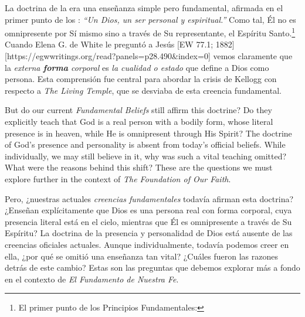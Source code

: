 La doctrina de la  era una enseñanza simple pero fundamental, afirmada en el primer punto de los : \textit{“Un Dios, un ser personal y espiritual.”} Como tal, Él no es omnipresente por Sí mismo sino a través de Su representante, el Espíritu Santo.\footnote{El primer punto de los Principios Fundamentales: } Cuando Elena G. de White le preguntó a Jesús [EW 77.1; 1882][https://egwwritings.org/read?panels=p28.490&index=0] vemos claramente que la \textit{externa \textbf{forma} corporal} es \textit{la cualidad o estado} que define a Dios como persona. Esta comprensión fue central para abordar la crisis de Kellogg con respecto a \textit{The Living Temple}, que se desviaba de esta creencia fundamental.


But do our current \textit{Fundamental Beliefs} still affirm this doctrine? Do they explicitly teach that God is a real person with a bodily form, whose literal presence is in heaven, while He is omnipresent through His Spirit? The doctrine of God’s presence and personality is absent from today’s official beliefs. While individually, we may still believe in it, why was such a vital teaching omitted? What were the reasons behind this shift? These are the questions we must explore further in the context of \textit{The Foundation of Our Faith}.


Pero, ¿nuestras actuales \textit{creencias fundamentales} todavía afirman esta doctrina? ¿Enseñan explícitamente que Dios es una persona real con forma corporal, cuya presencia literal está en el cielo, mientras que Él es omnipresente a través de Su Espíritu? La doctrina de la presencia y personalidad de Dios está ausente de las creencias oficiales actuales. Aunque individualmente, todavía podemos creer en ella, ¿por qué se omitió una enseñanza tan vital? ¿Cuáles fueron las razones detrás de este cambio? Estas son las preguntas que debemos explorar más a fondo en el contexto de \textit{El Fundamento de Nuestra Fe}.





% 
